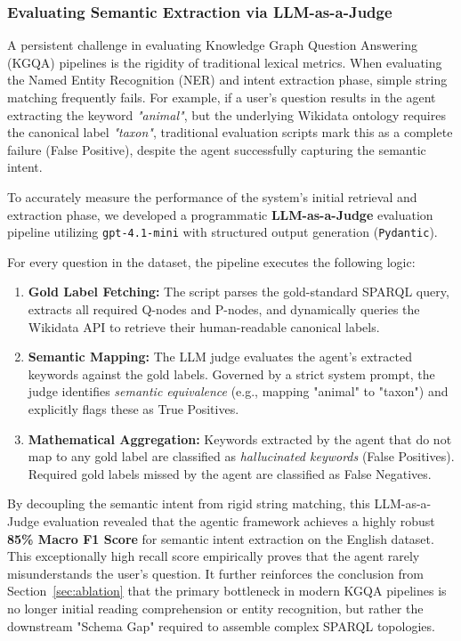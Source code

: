 \subsubsection{Evaluating Semantic Extraction via LLM-as-a-Judge}
\label{sec:llm_as_a_judge}

A persistent challenge in evaluating Knowledge Graph Question Answering (KGQA) pipelines is the rigidity of traditional lexical metrics. When evaluating the Named Entity Recognition (NER) and intent extraction phase, simple string matching frequently fails. For example, if a user's question results in the agent extracting the keyword \textit{"animal"}, but the underlying Wikidata ontology requires the canonical label \textit{"taxon"}, traditional evaluation scripts mark this as a complete failure (False Positive), despite the agent successfully capturing the semantic intent.

To accurately measure the performance of the system's initial retrieval and extraction phase, we developed a programmatic \textbf{LLM-as-a-Judge} evaluation pipeline utilizing \texttt{gpt-4.1-mini} with structured output generation (\texttt{Pydantic}). 

For every question in the dataset, the pipeline executes the following logic:
\begin{enumerate}
    \item \textbf{Gold Label Fetching:} The script parses the gold-standard SPARQL query, extracts all required Q-nodes and P-nodes, and dynamically queries the Wikidata API to retrieve their human-readable canonical labels.
    \item \textbf{Semantic Mapping:} The LLM judge evaluates the agent's extracted keywords against the gold labels. Governed by a strict system prompt, the judge identifies \textit{semantic equivalence} (e.g., mapping "animal" to "taxon") and explicitly flags these as True Positives. 
    \item \textbf{Mathematical Aggregation:} Keywords extracted by the agent that do not map to any gold label are classified as \textit{hallucinated keywords} (False Positives). Required gold labels missed by the agent are classified as False Negatives.
\end{enumerate}

By decoupling the semantic intent from rigid string matching, this LLM-as-a-Judge evaluation revealed that the agentic framework achieves a highly robust \textbf{85\% Macro F1 Score} for semantic intent extraction on the English dataset. This exceptionally high recall score empirically proves that the agent rarely misunderstands the user's question. It further reinforces the conclusion from Section~\ref{sec:ablation} that the primary bottleneck in modern KGQA pipelines is no longer initial reading comprehension or entity recognition, but rather the downstream "Schema Gap" required to assemble complex SPARQL topologies.

